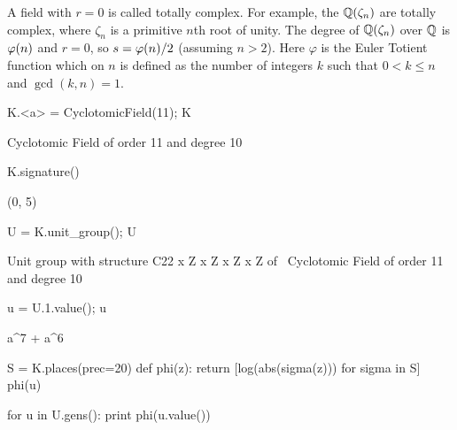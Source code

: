 A field with $r=0$ is called totally complex.  For
example, the  $\mathbb{Q}(\zeta_n)$ are totally
complex, where $\zeta_n$ is a primitive $n$th root of
unity.  The degree of $\mathbb{Q}(\zeta_n)$ over $\mathbb{Q}$ is
$\varphi(n)$ and $r=0$, so $s=\varphi(n)/2$ (assuming $n>2$).
Here $\varphi$ is the Euler Totient function which on $n$
is defined as the number of integers $k$ such that $0<k\leq n$
and $\gcd(k,n)=1$.
\begin{sagecode}
\begin{sagecell}
K.<a> = CyclotomicField(11); K
\end{sagecell}
\begin{sageout}
Cyclotomic Field of order 11 and degree 10
\end{sageout}
\begin{sagecell}
K.signature()
\end{sagecell}
\begin{sageout}
(0, 5)
\end{sageout}
\begin{sagecell}
U = K.unit_group(); U
\end{sagecell}
\begin{sageout}
Unit group with structure C22 x Z x Z x Z x Z of \
Cyclotomic Field of order 11 and degree 10
\end{sageout}
\begin{sagecell}
u = U.1.value(); u
\end{sagecell}
\begin{sageout}
a^7 + a^6
\end{sageout}
\begin{sagecell}
S = K.places(prec=20)
def phi(z):
    return [log(abs(sigma(z))) for sigma in S]
phi(u)
\end{sagecell}
\begin{sageout}
[-1.2566, -0.18533, 0.26982, 0.52028, 0.65180]
\end{sageout}
\begin{sagecell}
for u in U.gens():
    print phi(u.value())
\end{sagecell}
\begin{sageout}
[0.00000, 0.00000, 0.00000, -9.5367e-7, 0.00000]
[-1.2566, -0.18533, 0.26982, 0.52028, 0.65180]
[-0.26981, -0.52028, 0.18533, -0.65180, 1.2566]
[0.65180, 0.26981, -1.2566, -0.18533, 0.52029]
[-0.084486, -1.1721, -0.33496, 0.60477, 0.98675]
\end{sageout}
\end{sagecode}


